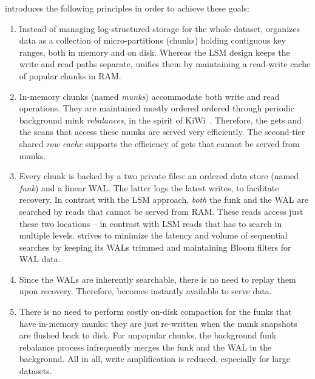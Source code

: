 \sys\/ introduces the following principles in order to achieve these goals: 
\begin{enumerate}

\item Instead of managing log-structured storage for the whole dataset, 
\sys\/ organizes data as a collection of micro-partitions (chunks) holding contiguous key ranges, 
both in memory and on disk. Whereas the LSM design keeps the write and read paths separate, 
\sys\/ unifies them by maintaining a read-write cache of popular chunks in RAM. 

\item In-memory chunks (named {\em munks}) accommodate both write and read operations. 
They are maintained mostly ordered ordered through periodic background mink {\em rebalances}, 
in the spirit of KiWi~\cite{KiWi}. Therefore, the gets and the scans that access these munks are 
served very efficiently. The second-tier shared {\emph{row cache}} supports the efficiency of 
gets that cannot be served from munks. 

\item Every chunk is backed by a two private files: an ordered data store (named {\em funk}) 
and a linear WAL. The latter logs the latest writes, to facilitate recovery. In contrast 
with the LSM approach, {\em both\/} the funk and the WAL are searched by reads that cannot 
be served from RAM. These reads access just these two locations -- in contrast with LSM reads  
that has to search in multiple levels. \sys\/ strives to minimize the latency and volume of sequential 
searches by keeping its WALs trimmed and maintaining Bloom filters for WAL data. 

\item Since the WALs are inherently searchable, there is no need to replay them upon recovery. 
Therefore, \sys\/ becomes instantly available to serve data. 

\item There is no need to perform costly on-disk compaction for the funks that have in-memory 
munks; they are just re-written when the munk snapshots are flushed back to disk. For unpopular chunks, 
the background funk rebalance process infrequently merges the funk and the WAL in the background. 
All in all, write amplification is reduced, especially for large datasets. 
 \end{enumerate}
 

